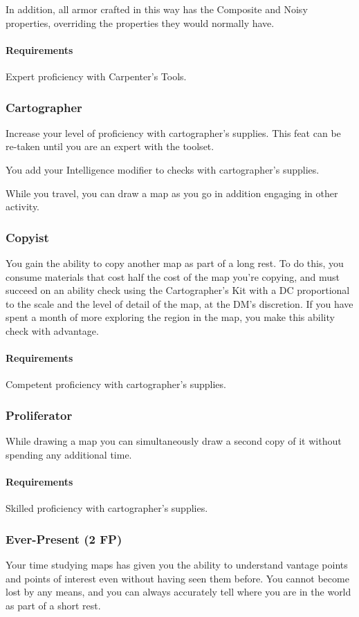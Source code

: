     In addition, all armor crafted in this way has the Composite and Noisy properties, overriding the properties they would normally have.
    \paragraph{Requirements} Expert proficiency with Carpenter's Tools.

\subsubsection{Cartographer} \label{feat::cartographer}
    Increase your level of proficiency with cartographer's supplies.
    This feat can be re-taken until you are an expert with the toolset.

    You add your Intelligence modifier to checks with cartographer's supplies.

    While you travel, you can draw a map as you go in addition engaging in other activity.
\subsubsection{Copyist} \label{feat::copyist}
    You gain the ability to copy another map as part of a long rest.
    To do this, you consume materials that cost half the cost of the map you're copying, and must succeed on an ability check using the Cartographer's Kit with a DC proportional to the scale and the level of detail of the map, at the DM's discretion.
    If you have spent a month of more exploring the region in the map, you make this ability check with advantage.
    \paragraph{Requirements} Competent proficiency with cartographer's supplies.
\subsubsection{Proliferator} \label{feat::proliferator}
    While drawing a map you can simultaneously draw a second copy of it without spending any additional time.
    \paragraph{Requirements} Skilled proficiency with cartographer's supplies.
\subsubsection{Ever-Present (2 FP)} \label{feat::everpresent}
    Your time studying maps has given you the ability to understand vantage points and points of interest even without having seen them before.
    You cannot become lost by any means, and you can always accurately tell where you are in the world as part of a short rest.
